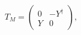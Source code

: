 \begin{equation}
T_{M}=\left(
\begin{array}{cc}
0 & -Y^{\dagger} \\
Y & 0
\end{array}
\right) ,
\end{equation}

